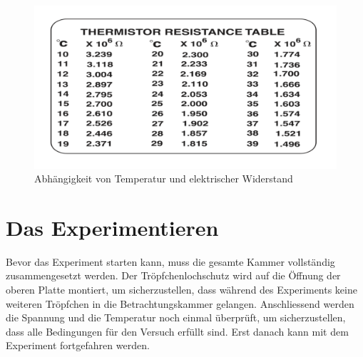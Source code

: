 \begin{figure}[ht]
	\begin{center}
		\includegraphics[scale=0.25]{bilder/pdf/TemperaturTabelle.pdf}
		\caption{Abhängigkeit von Temperatur und elektrischer Widerstand \parencite[24]{instructionManual}}
		\label{fig:widerstandTemperatur}
	\end{center}
\end{figure}

\section{Das Experimentieren}\label{sec:durchfuehrung}
Bevor das Experiment starten kann, muss die gesamte Kammer vollständig zusammengesetzt werden. Der Tröpfchenlochschutz wird auf die Öffnung der oberen Platte montiert, um sicherzustellen, dass während des Experiments keine weiteren Tröpfchen in die Betrachtungskammer gelangen. Anschliessend werden die Spannung und die Temperatur noch einmal überprüft, um sicherzustellen, dass alle Bedingungen für den Versuch erfüllt sind. Erst danach kann mit dem Experiment fortgefahren werden.

